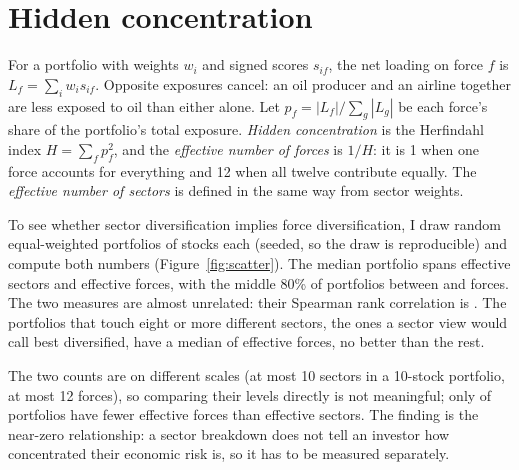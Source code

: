 \documentclass[11pt]{article}
\begin{document}
\begin{table}[t]
\centering
\caption{The twelve forces and how many companies the AI drafts link to each (of \nProfiled). ``Hurt'' counts negative scores.}\label{tab:forces}
\end{table}

\section{Hidden concentration}\label{sec:concentration}

For a portfolio with weights $w_i$ and signed scores $s_{if}$, the net loading on force $f$ is $L_f = \sum_i w_i s_{if}$. Opposite exposures cancel: an oil producer and an airline together are less exposed to oil than either alone. Let $p_f = |L_f| / \sum_g |L_g|$ be each force's share of the portfolio's total exposure. \emph{Hidden concentration} is the Herfindahl index $H = \sum_f p_f^2$, and the \emph{effective number of forces} is $1/H$: it is 1 when one force accounts for everything and 12 when all twelve contribute equally. The \emph{effective number of sectors} is defined in the same way from sector weights.

To see whether sector diversification implies force diversification, I draw \nRandom{} random equal-weighted portfolios of \randomSize{} stocks each (seeded, so the draw is reproducible) and compute both numbers (Figure~\ref{fig:scatter}). The median portfolio spans \medianEffSectors{} effective sectors and \medianEffForces{} effective forces, with the middle 80\% of portfolios between \loEffForces{} and \hiEffForces{} forces. The two measures are almost unrelated: their Spearman rank correlation is \spearmanSectorsForces. The \nBroad{} portfolios that touch eight or more different sectors, the ones a sector view would call best diversified, have a median of \broadMedianForces{} effective forces, no better than the rest.

The two counts are on different scales (at most 10 sectors in a 10-stock portfolio, at most 12 forces), so comparing their levels directly is not meaningful; only \shareForcesBelowSectors{} of portfolios have fewer effective forces than effective sectors. The finding is the near-zero relationship: a sector breakdown does not tell an investor how concentrated their economic risk is, so it has to be measured separately.
\end{document}
